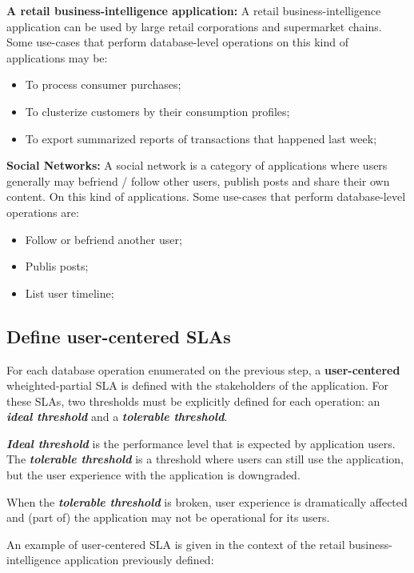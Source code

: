 \textbf{A retail business-intelligence application: } A retail business-intelligence application can be used by large retail corporations and supermarket chains. Some use-cases that perform database-level operations on this kind of applications may be:

\begin{itemize}
\item{To process consumer purchases;}
\item{To clusterize customers by their consumption profiles;}
\item{To export summarized reports of transactions that happened last week;}
\end{itemize}

\textbf{Social Networks:} A social network is a category of applications where users generally may befriend / follow other users, publish posts and share their own content. On this kind of applications. Some use-cases that perform database-level operations are: 

\begin{itemize}
\item{Follow or befriend another user;}
\item{Publis posts;}
\item{List user timeline;}
\end{itemize}


\subsection{Define user-centered SLAs}
\label{defineusercenteredslas}
For each database operation enumerated on the previous step, a \textbf{user-centered} wheighted-partial SLA is defined with the stakeholders of the application. For these SLAs, two thresholds must be explicitly defined for each operation: an \textbf{\textit{ideal threshold}} and a \textbf{\textit{tolerable threshold}}.

\textbf{\textit{Ideal threshold}} is the performance level that is expected by application users. The \textbf{\textit{tolerable threshold}} is a threshold where users can still use the application, but the user experience with the application is downgraded.

When the \textbf{\textit{tolerable threshold}} is broken, user experience is dramatically affected and (part of) the application may not be operational for its users.

An example of user-centered SLA is given in the context of the retail business-intelligence application previously defined: 

